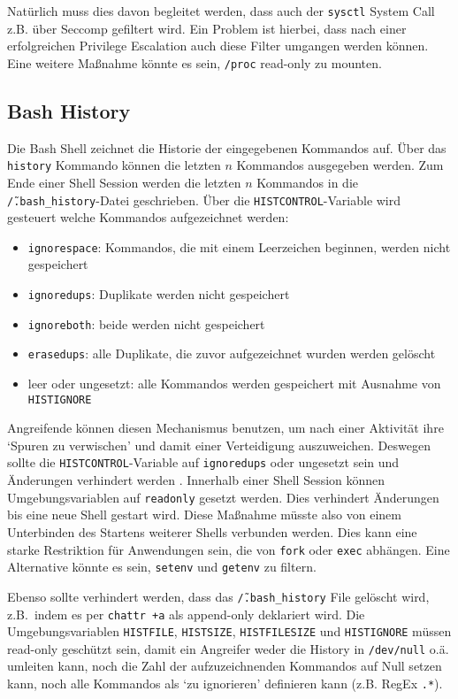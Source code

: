 Natürlich muss dies davon begleitet werden, dass auch der \texttt{sysctl} System Call z.B. über Seccomp gefiltert wird. Ein Problem ist hierbei, dass nach einer erfolgreichen Privilege Escalation auch diese Filter umgangen werden können. Eine weitere Maßnahme könnte es sein, \texttt{/proc} read-only zu mounten.

\subsection{Bash History}

Die Bash Shell zeichnet die Historie der eingegebenen Kommandos auf. Über das \texttt{history} Kommando können die letzten $n$ Kommandos ausgegeben werden. Zum Ende einer Shell Session werden die letzten $n$ Kommandos in die \texttt{\~/.bash\_history}-Datei geschrieben. Über die \texttt{HISTCONTROL}-Variable wird gesteuert welche Kommandos aufgezeichnet werden:

\begin{itemize}
    \item \texttt{ignorespace}: Kommandos, die mit einem Leerzeichen beginnen, werden nicht gespeichert
    \item \texttt{ignoredups}: Duplikate werden nicht gespeichert
    \item \texttt{ignoreboth}: beide werden nicht gespeichert
    \item \texttt{erasedups}: alle Duplikate, die zuvor aufgezeichnet wurden werden gelöscht
    \item leer oder ungesetzt: alle Kommandos werden gespeichert mit Ausnahme von \texttt{HISTIGNORE}
\end{itemize}

Angreifende können diesen Mechanismus benutzen, um nach einer Aktivität ihre `Spuren zu verwischen' und damit einer Verteidigung auszuweichen. Deswegen sollte die \texttt{HISTCONTROL}-Variable auf \texttt{ignoredups} oder ungesetzt sein und Änderungen verhindert werden \cite{attack-histcontrol}. Innerhalb einer Shell Session können Umgebungsvariablen auf \texttt{readonly} gesetzt werden. Dies verhindert Änderungen bis eine neue Shell gestart wird. Diese Maßnahme müsste also von einem
Unterbinden des Startens weiterer Shells verbunden werden. Dies kann eine starke Restriktion für Anwendungen sein, die von \texttt{fork} oder \texttt{exec} abhängen. Eine Alternative könnte es sein, \texttt{setenv} und \texttt{getenv} zu filtern.

Ebenso sollte verhindert werden, dass das \texttt{\~/.bash\_history} File gelöscht wird, z.B.\ indem es per \texttt{chattr +a} als append-only deklariert wird. Die Umgebungsvariablen \texttt{HISTFILE}, \texttt{HISTSIZE}, \texttt{HISTFILESIZE} und \texttt{HISTIGNORE} müssen read-only geschützt sein, damit ein Angreifer weder die History in \texttt{/dev/null} o.ä. umleiten kann, noch die Zahl der aufzuzeichnenden Kommandos auf Null setzen kann, noch alle Kommandos als `zu
ignorieren' definieren kann (z.B. RegEx \texttt{.*}).

